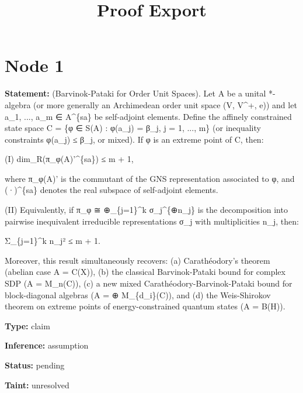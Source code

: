 \documentclass{article}
\title{Proof Export}
\date{}
\begin{document}
\maketitle

\section*{Node 1}

\textbf{Statement:} (Barvinok-Pataki for Order Unit Spaces). Let A be a unital *-algebra (or more generally an Archimedean order unit space (V, V\textasciicircum{}+, e)) and let a\_1, ..., a\_m ∈ A\textasciicircum{}\{sa\} be self-adjoint elements. Define the affinely constrained state space C = \{φ ∈ S(A) : φ(a\_j) = β\_j, j = 1, ..., m\} (or inequality constraints φ(a\_j) ≤ β\_j, or mixed). If φ is an extreme point of C, then:

(I) dim\_R(π\_φ(A)'\textasciicircum{}\{sa\}) ≤ m + 1,

where π\_φ(A)' is the commutant of the GNS representation associated to φ, and (·)\textasciicircum{}\{sa\} denotes the real subspace of self-adjoint elements.

(II) Equivalently, if π\_φ ≅ ⊕\_\{j=1\}\textasciicircum{}k σ\_j\textasciicircum{}\{⊕n\_j\} is the decomposition into pairwise inequivalent irreducible representations σ\_j with multiplicities n\_j, then:

Σ\_\{j=1\}\textasciicircum{}k n\_j² ≤ m + 1.

Moreover, this result simultaneously recovers: (a) Carathéodory's theorem (abelian case A = C(X)), (b) the classical Barvinok-Pataki bound for complex SDP (A = M\_n(C)), (c) a new mixed Carathéodory-Barvinok-Pataki bound for block-diagonal algebras (A = ⊕ M\_\{d\_i\}(C)), and (d) the Weis-Shirokov theorem on extreme points of energy-constrained quantum states (A = B(H)).

\textbf{Type:} claim

\textbf{Inference:} assumption

\textbf{Status:} pending

\textbf{Taint:} unresolved
\end{document}
